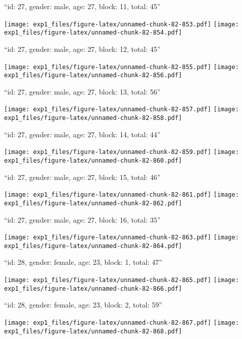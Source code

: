 \documentclass[11pt,,]{article}
\begin{document}
\newpage
[1] 

``id: 27, gender: male, age: 27, block: 11, total: 45''

\texttt{[image: exp1\_files/figure-latex/unnamed-chunk-82-853.pdf]}
\texttt{[image: exp1\_files/figure-latex/unnamed-chunk-82-854.pdf]}

\newpage
[1] 

``id: 27, gender: male, age: 27, block: 12, total: 45''

\texttt{[image: exp1\_files/figure-latex/unnamed-chunk-82-855.pdf]}
\texttt{[image: exp1\_files/figure-latex/unnamed-chunk-82-856.pdf]}

\newpage
[1] 

``id: 27, gender: male, age: 27, block: 13, total: 56''

\texttt{[image: exp1\_files/figure-latex/unnamed-chunk-82-857.pdf]}
\texttt{[image: exp1\_files/figure-latex/unnamed-chunk-82-858.pdf]}

\newpage
[1] 

``id: 27, gender: male, age: 27, block: 14, total: 44''

\texttt{[image: exp1\_files/figure-latex/unnamed-chunk-82-859.pdf]}
\texttt{[image: exp1\_files/figure-latex/unnamed-chunk-82-860.pdf]}

\newpage
[1] 

``id: 27, gender: male, age: 27, block: 15, total: 46''

\texttt{[image: exp1\_files/figure-latex/unnamed-chunk-82-861.pdf]}
\texttt{[image: exp1\_files/figure-latex/unnamed-chunk-82-862.pdf]}

\newpage
[1] 

``id: 27, gender: male, age: 27, block: 16, total: 35''

\texttt{[image: exp1\_files/figure-latex/unnamed-chunk-82-863.pdf]}
\texttt{[image: exp1\_files/figure-latex/unnamed-chunk-82-864.pdf]}

\newpage
[1] 

``id: 28, gender: female, age: 23, block: 1, total: 47''

\texttt{[image: exp1\_files/figure-latex/unnamed-chunk-82-865.pdf]}
\texttt{[image: exp1\_files/figure-latex/unnamed-chunk-82-866.pdf]}

\newpage
[1] 

``id: 28, gender: female, age: 23, block: 2, total: 59''

\texttt{[image: exp1\_files/figure-latex/unnamed-chunk-82-867.pdf]}
\texttt{[image: exp1\_files/figure-latex/unnamed-chunk-82-868.pdf]}
\end{document}
